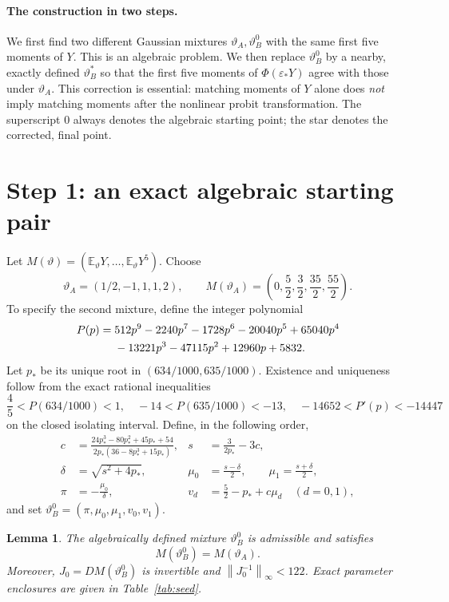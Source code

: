 \documentclass[11pt,a4paper]{article}
\numberwithin{equation}{section}
\newtheorem{lemma}{Lemma}
\newcommand{\E}{\mathbb E}
\newcommand{\vt}{\vartheta}
\newcommand{\norm}[1]{\left\lVert#1\right\rVert_\infty}
\begin{document}
\paragraph{The construction in two steps.}
We first find two different Gaussian mixtures $\vt_A,\vt_B^0$ with the same first five moments of $Y$. This is an algebraic problem. We then replace $\vt_B^0$ by a nearby, exactly defined $\vt_B^*$ so that the first five moments of $\Phi(\varepsilon_*Y)$ agree with those under $\vt_A$. This correction is essential: matching moments of $Y$ alone does \emph{not} imply matching moments after the nonlinear probit transformation. The superscript $0$ always denotes the algebraic starting point; the star denotes the corrected, final point.

\section{Step 1: an exact algebraic starting pair}\label{sec:seeds}
Let $M(\vt)=(\E_\vt Y,\ldots,\E_\vt Y^5)$. Choose
\begin{equation}\label{eq:seedA}
 \vt_A=(1/2,-1,1,1,2),\qquad
 M(\vt_A)=\left(0,\frac52,\frac32,\frac{35}2,\frac{55}2\right).
\end{equation}
To specify the second mixture, define the integer polynomial
\begin{align}\label{eq:P}
 P(p)={}&512p^9-2240p^7-1728p^6-20040p^5+65040p^4\notag\\
       &-13221p^3-47115p^2+12960p+5832.
\end{align}
Let $p_*$ be its unique root in $(634/1000,635/1000)$. Existence and uniqueness follow from the exact rational inequalities
\begin{equation}\label{eq:isolate}
 \frac45<P(634/1000)<1,\quad -14<P(635/1000)<-13,
 \quad -14652<P'(p)<-14447
\end{equation}
on the closed isolating interval. Define, in the following order,
\begin{align}
 c&=\frac{24p_*^3-80p_*^2+45p_*+54}{2p_*(36-8p_*^3+15p_*)},
 &s&=\frac{3}{2p_*}-3c,\label{eq:cs}\\
 \delta&=\sqrt{s^2+4p_*},&
 \mu_0&=\frac{s-\delta}{2},\qquad\mu_1=\frac{s+\delta}{2},\label{eq:means}\\
 \pi&=-\frac{\mu_0}{\delta},&v_d&=\frac52-p_*+c\mu_d\quad(d=0,1),\label{eq:recover}
\end{align}
and set $\vt_B^0=(\pi,\mu_0,\mu_1,v_0,v_1)$.

\begin{lemma}\label{lem:seed}
The algebraically defined mixture $\vt_B^0$ is admissible and satisfies
\begin{equation}\label{eq:Mmatch}
 M(\vt_B^0)=M(\vt_A).
\end{equation}
Moreover, $J_0=DM(\vt_B^0)$ is invertible and $\norm{J_0^{-1}}<122$. Exact parameter enclosures are given in Table~\ref{tab:seed}.
\end{lemma}
\end{document}
